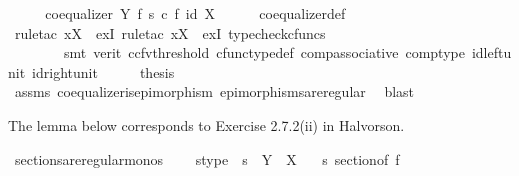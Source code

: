 \begin{isabellebody}
\ \ \isamarkupfalse%
\ \isamarkupfalse%
\ {\isachardoublequoteopen}coequalizer\ Y\ f\ {\isacharparenleft}{\kern0pt}s\ {\isasymcirc}\isactrlsub c\ f{\isacharparenright}{\kern0pt}\ {\isacharparenleft}{\kern0pt}id\ X{\isacharparenright}{\kern0pt}{\isachardoublequoteclose}\isanewline
\ \ \ \ \isamarkupfalse%
\ coequalizer{\isacharunderscore}{\kern0pt}def\ \isanewline
\ \ \ \ \isamarkupfalse%
\ {\isacharparenleft}{\kern0pt}rule{\isacharunderscore}{\kern0pt}tac\ x{\isacharequal}{\kern0pt}{\isachardoublequoteopen}X{\isachardoublequoteclose}\ \ exI{\isacharcomma}{\kern0pt}\ rule{\isacharunderscore}{\kern0pt}tac\ x{\isacharequal}{\kern0pt}{\isachardoublequoteopen}X{\isachardoublequoteclose}\ \ exI{\isacharcomma}{\kern0pt}\ typecheck{\isacharunderscore}{\kern0pt}cfuncs{\isacharcomma}{\kern0pt}\isanewline
\ \ \ \ \ \ \ \ smt\ {\isacharparenleft}{\kern0pt}verit{\isacharcomma}{\kern0pt}\ ccfv{\isacharunderscore}{\kern0pt}threshold{\isacharparenright}{\kern0pt}\ cfunc{\isacharunderscore}{\kern0pt}type{\isacharunderscore}{\kern0pt}def\ comp{\isacharunderscore}{\kern0pt}associative\ comp{\isacharunderscore}{\kern0pt}type\ id{\isacharunderscore}{\kern0pt}left{\isacharunderscore}{\kern0pt}unit{}\ id{\isacharunderscore}{\kern0pt}right{\isacharunderscore}{\kern0pt}unit{}{\isacharparenright}{\kern0pt}\isanewline
\ \ \isamarkupfalse%
\ \isamarkupfalse%
\ {\isacharquery}{\kern0pt}thesis\isanewline
\ \ \ \ \isamarkupfalse%
\ assms\ coequalizer{\isacharunderscore}{\kern0pt}is{\isacharunderscore}{\kern0pt}epimorphism\ epimorphisms{\isacharunderscore}{\kern0pt}are{\isacharunderscore}{\kern0pt}regular\ \isamarkupfalse%
\ blast\isanewline
{}\isamarkupfalse%
%
\endisatagproof
{\isafoldproof}%
%
\isadelimproof
%
\endisadelimproof
%
\begin{isamarkuptext}%
The lemma below corresponds to Exercise 2.7.2(ii) in Halvorson.%
\end{isamarkuptext}\isamarkuptrue%
\isamarkupfalse%
\ sections{\isacharunderscore}{\kern0pt}are{\isacharunderscore}{\kern0pt}regular{\isacharunderscore}{\kern0pt}monos{\isacharcolon}{\kern0pt}\ \isanewline
\ \ \ s{\isacharunderscore}{\kern0pt}type{\isacharcolon}{\kern0pt}\ \ {\isachardoublequoteopen}s\ {\isacharcolon}{\kern0pt}\ Y\ {\isasymrightarrow}\ X{\isachardoublequoteclose}\isanewline
\ \ \ {\isachardoublequoteopen}s\ sectionof\ f{\isachardoublequoteclose}\isanewline

\end{isabellebody}
